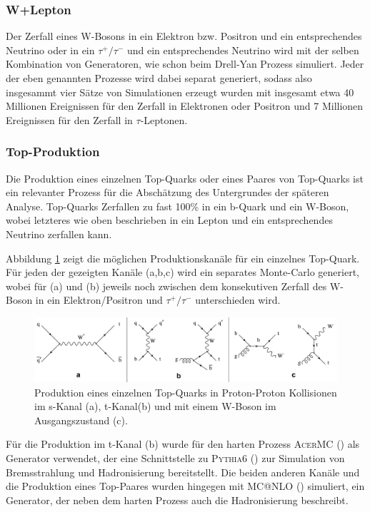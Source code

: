 \subsubsection*{W+Lepton}
Der Zerfall eines W-Bosons in ein Elektron bzw. Positron und ein entsprechendes
Neutrino oder in ein $\tau^+/\tau^-$ und ein entsprechendes Neutrino wird mit
der selben Kombination von Generatoren, wie schon beim Drell-Yan Prozess
simuliert. Jeder der eben genannten Prozesse wird dabei separat generiert,
sodass also insgesammt vier Sätze von Simulationen erzeugt wurden mit insgesamt
etwa 40 Millionen Ereignissen für den Zerfall in Elektronen oder Positron und
7 Millionen Ereignissen für den Zerfall in $\tau$-Leptonen.

\subsubsection*{Top-Produktion}
Die Produktion eines einzelnen Top-Quarks oder eines Paares von Top-Quarks ist
ein relevanter Prozess für die Abschätzung des Untergrundes der späteren
Analyse. Top-Quarks Zerfallen zu fast 100\% in ein b-Quark und ein W-Boson,
wobei letzteres wie oben beschrieben in ein Lepton und ein entsprechendes
Neutrino zerfallen kann.

Abbildung \ref{fig:singletop} zeigt die möglichen Produktionskanäle für ein
einzelnes Top-Quark. Für jeden der gezeigten Kanäle (a,b,c) wird ein separates
Monte-Carlo generiert, wobei für (a) und (b) jeweils noch zwischen dem
konsekutiven Zerfall des W-Boson in ein Elektron/Positron und $\tau^+/\tau^-$
unterschieden wird.

\begin{figure}
    \centering
    \includegraphics[width=1.\textwidth]{img/singletop}
    \caption[Produktionskanäle für ein einzelnes Top-Quark in Proton-Proton
        Kollisionen]
        {Produktion eines einzelnen Top-Quarks in Proton-Proton Kollisionen im
        s-Kanal (a), t-Kanal(b) und mit einem W-Boson im Ausgangszustand (c).}
    \label{fig:singletop}
\end{figure}

Für die Produktion im t-Kanal (b) wurde für den harten Prozess \textsc{AcerMC}
(\cite{Kersevan:2004yg}) als Generator verwendet, der eine Schnittstelle zu
\textsc{Pythia6} (\cite{1126-6708-2006-05-026}) zur Simulation von
Bremsstrahlung und Hadronisierung bereitstellt. Die beiden anderen Kanäle und
die Produktion eines Top-Paares wurden hingegen mit \textsc{MC@NLO}
(\cite{Frixione:2002ik}) simuliert, ein Generator, der neben dem harten Prozess
auch die Hadronisierung beschreibt.






